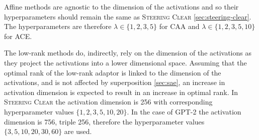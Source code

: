 Affine methods are agnostic to the dimension of the activations and so their hyperparameters should remain the same as {\scshape Steering Clear} \cref{sec:steering-clear}.
The hyperparameters are therefore $\lambda \in \{1, 2, 3, 5\}$ for CAA and $\lambda \in \{1, 2, 3, 5, 10\}$ for ACE.

The low-rank methods do, indirectly, rely on the dimension of the activations as they project the activations into a lower dimensional space.
Assuming that the optimal rank of the low-rank adaptor is linked to the dimension of the activations, and is not affected by superposition \cref{sec:sae}, an increase in activation dimension is expected to result in an increase in optimal rank.
In {\scshape Steering Clear} the activation dimension is 256 with corresponding hyperparameter values $\{1, 2, 3, 5, 10, 20\}$.
In the case of GPT-2 \cite{gpt-2} the activation dimension is 756, triple 256, therefore the hyperparameter values $\{3, 5, 10, 20, 30, 60\}$ are used.
